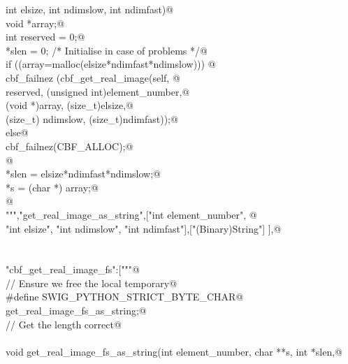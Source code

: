 \documentclass[10pt,a4paper,twoside,notitlepage]{article}
\begin{document}
\begin{flushleft}
\begin{list}{}{}
\mbox{}\verb@    int elsize, int ndimslow, int ndimfast){@\\
\mbox{}\verb@        void *array;@\\
\mbox{}\verb@        int reserved = 0;@\\
\mbox{}\verb@        *slen = 0; /* Initialise in case of problems */@\\
\mbox{}\verb@        if ((array=malloc(elsize*ndimfast*ndimslow))) {@\\
\mbox{}\verb@               cbf_failnez (cbf_get_real_image(self, @\\
\mbox{}\verb@               reserved, (unsigned int)element_number,@\\
\mbox{}\verb@               (void *)array, (size_t)elsize,@\\
\mbox{}\verb@               (size_t) ndimslow, (size_t)ndimfast));@\\
\mbox{}\verb@         }else{@\\
\mbox{}\verb@               cbf_failnez(CBF_ALLOC);@\\
\mbox{}\verb@         }@\\
\mbox{}\verb@        *slen = elsize*ndimfast*ndimslow;@\\
\mbox{}\verb@        *s = (char *) array;@\\
\mbox{}\verb@      }@\\
\mbox{}\verb@""","get_real_image_as_string",["int element_number", @\\
\mbox{}\verb@    "int elsize", "int ndimslow", "int ndimfast"],["(Binary)String"] ],@\\
\mbox{}\verb@@\\
\mbox{}\verb@@\\
\mbox{}\verb@"cbf_get_real_image_fs":["""@\\
\mbox{}\verb@// Ensure we free the local temporary@\\
\mbox{}\verb@%{@\\
\mbox{}\verb@#define SWIG_PYTHON_STRICT_BYTE_CHAR@\\
\mbox{}\verb@%}@\\
\mbox{}\verb@%cstring_output_allocate_size(char ** s, int *slen, free(*$1))@\\
\mbox{}\verb@       get_real_image_fs_as_string;@\\
\mbox{}\verb@// Get the length correct@\\
\mbox{}\verb@@\\
\mbox{}\verb@    void get_real_image_fs_as_string(int element_number, char **s, int *slen,@\\

\end{list}
\end{flushleft}
\end{document}
